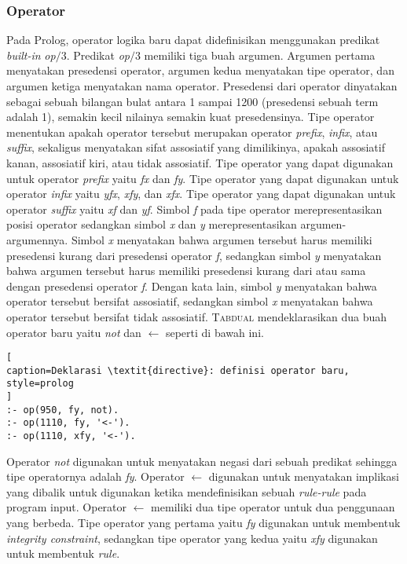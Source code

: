 \subsubsection{Operator}

Pada Prolog, operator logika baru dapat didefinisikan menggunakan predikat \textit{built-in} \textit{op$/$}3. Predikat \textit{op$/$}3 memiliki tiga buah argumen. Argumen pertama menyatakan presedensi operator, argumen kedua menyatakan tipe operator, dan argumen ketiga menyatakan nama operator. Presedensi dari operator dinyatakan sebagai sebuah bilangan bulat antara 1 sampai 1200 (presedensi sebuah term adalah 1), semakin kecil nilainya semakin kuat presedensinya. Tipe operator menentukan apakah operator tersebut merupakan operator \textit{prefix}, \textit{infix}, atau \textit{suffix}, sekaligus menyatakan sifat assosiatif yang dimilikinya, apakah assosiatif kanan, assosiatif kiri, atau tidak assosiatif. Tipe operator yang dapat digunakan untuk operator \textit{prefix} yaitu \textit{fx} dan \textit{fy}. Tipe operator yang dapat digunakan untuk operator \textit{infix} yaitu \textit{yfx}, \textit{xfy}, dan \textit{xfx}. Tipe operator yang dapat digunakan untuk operator \textit{suffix} yaitu \textit{xf} dan \textit{yf}. Simbol \textit{f} pada tipe operator merepresentasikan posisi operator sedangkan simbol \textit{x} dan \textit{y} merepresentasikan argumen-argumennya. Simbol \textit{x} menyatakan bahwa argumen tersebut harus memiliki presedensi kurang dari presedensi operator \textit{f}, sedangkan simbol \textit{y} menyatakan bahwa argumen tersebut harus memiliki presedensi kurang dari atau sama dengan presedensi operator \textit{f}. Dengan kata lain, simbol \textit{y} menyatakan bahwa operator tersebut bersifat assosiatif, sedangkan simbol \textit{x} menyatakan bahwa operator tersebut bersifat tidak assosiatif. \textsc{Tabdual} mendeklarasikan dua buah operator baru yaitu \textit{not} dan $\leftarrow$ seperti di bawah ini.
\\

\begin{lstlisting}[
caption=Deklarasi \textit{directive}: definisi operator baru,
style=prolog
]
:- op(950, fy, not).
:- op(1110, fy, '<-').
:- op(1110, xfy, '<-').
\end{lstlisting}

Operator \textit{not} digunakan untuk menyatakan negasi dari sebuah predikat sehingga tipe operatornya adalah \textit{fy}. Operator $\leftarrow$ digunakan untuk menyatakan implikasi yang dibalik untuk digunakan ketika mendefinisikan sebuah \textit{rule-rule} pada program input. Operator $\leftarrow$ memiliki dua tipe operator untuk dua penggunaan yang berbeda. Tipe operator yang pertama yaitu \textit{fy} digunakan untuk membentuk \textit{integrity constraint}, sedangkan tipe operator yang kedua yaitu \textit{xfy} digunakan untuk membentuk \textit{rule}.

